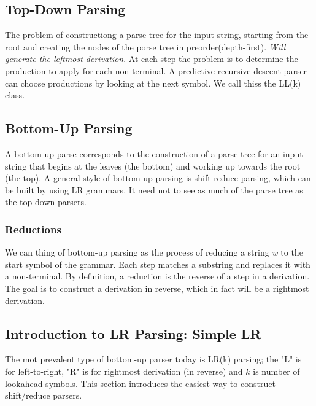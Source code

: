 \documentclass{article}
\begin{document}
\subsection{Top-Down Parsing} %
\label{sub:Top-Down Parsing}
The problem of constructiong a parse tree for the input string, starting from the root and creating the nodes of the porse tree in preorder(depth-first). \emph{Will generate the leftmost derivation}. At each step the problem is to determine the production to apply for each non-terminal. A predictive recursive-descent parser can choose productions by looking at the next symbol. We call thiss the LL(k) class.

\subsection{Bottom-Up Parsing} %
\label{sub:Bottom-Up Parsing}
A bottom-up parse corresponds to the construction of a parse tree for an input string that begins at the leaves (the bottom) and working up towards the root (the top). A general style of bottom-up parsing is shift-reduce parsing, which can be built by using LR grammars. It need not to see as much of the parse tree as the top-down parsers.
\subsubsection{Reductions} %
\label{ssub:Reductions}
We can thing of bottom-up parsing as the process of reducing a string \emph{w} to the start symbol of the grammar. Each step matches a substring and replaces it with a non-terminal. By definition, a reduction is the reverse of a step in a derivation. The goal is to construct a derivation in reverse, which in fact will be a rightmost derivation.


\subsection{Introduction to LR Parsing: Simple LR} %
\label{sub:Introduction to LR Parsing: Simple LR}
The mot prevalent type of bottom-up parser today is LR(k) parsing; the "L" is for left-to-right, "R" is for rightmost derivation (in reverse) and $k$ is number of lookahead symbols. This section introduces the easiest way to construct shift/reduce parsers.
\end{document}

